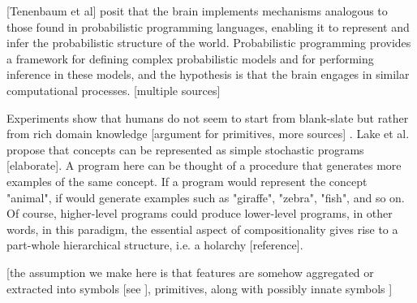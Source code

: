 [Tenenbaum et al] posit that the brain implements mechanisms analogous to those found in probabilistic programming languages, enabling it to represent and infer the probabilistic structure of the world. Probabilistic programming provides a framework for defining complex probabilistic models and for performing inference in these models, and the hypothesis is that the brain engages in similar computational processes. [multiple sources]

Experiments show that humans do not seem to start from blank-slate but rather from rich domain knowledge [argument for primitives, more sources] \cite{lake_building_2016}. Lake et al. propose that concepts can be represented as simple stochastic programs [elaborate]. A program here can be thought of a procedure that generates more examples of the same concept. If a program would represent the concept "animal", if would generate examples such as "giraffe", "zebra", "fish", and so on. Of course, higher-level programs could produce lower-level programs, in other words, in this paradigm, the essential aspect of compositionality gives rise to a part-whole hierarchical structure, i.e. a holarchy [reference].

[the assumption we make here is that features are somehow aggregated or extracted into symbols [see \cite{garcez_neurosymbolic_2020}], primitives, along with possibly innate symbols \cite{Lake_Ullman_Tenenbaum_Gershman_2017}] 


